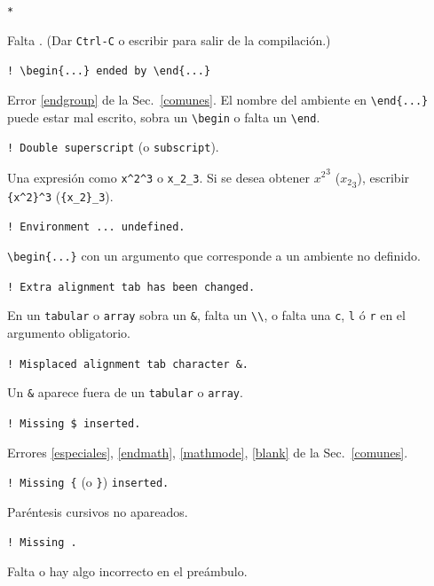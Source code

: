 \begin{list}{}{\setlength{\leftmargin}{0pt}}
\item \verb+*+

Falta \verb++. (Dar \verb+Ctrl-C+ o escribir
\verb++ para salir de la compilaci{\'o}n.)

\item \verb+! \begin{...} ended by \end{...}+

Error \ref{endgroup} de la Sec.\ \ref{comunes}. El nombre del
ambiente en \verb+\end{...}+ puede estar mal escrito, sobra un
\verb+\begin+ o falta un \verb+\end+. 

\item \verb+! Double superscript+ (o \verb+subscript+).

Una expresi{\'o}n como \verb+x^2^3+ o \verb+x_2_3+. Si se desea obtener
${x^2}^3$ (${x_2}_3$), escribir \verb+{x^2}^3+ (\verb+{x_2}_3+). 

\item \verb+! Environment ... undefined.+

\verb+\begin{...}+ con un argumento que corresponde a un ambiente no
definido. 

\item \verb+! Extra alignment tab has been changed.+

En un \verb+tabular+ o \verb+array+ sobra un \verb+&+, falta un
\verb+\\+, o falta una \verb+c+, \verb+l+ {\'o} \verb+r+ en el
argumento obligatorio.

\item \verb+! Misplaced alignment tab character &.+

Un \verb+&+ aparece fuera de un \verb+tabular+ o \verb+array+.

\item \verb+! Missing $ inserted.+

Errores \ref{especiales}, \ref{endmath}, \ref{mathmode}, \ref{blank}
de la Sec.\ \ref{comunes}.

\item \verb+! Missing {+ (o \verb+}+) \verb+inserted.+

Par{\'e}ntesis cursivos no apareados.

\item \verb+! Missing .+

Falta \verb++ o hay algo incorrecto en el
pre{\'a}mbulo. 


\end{list}
